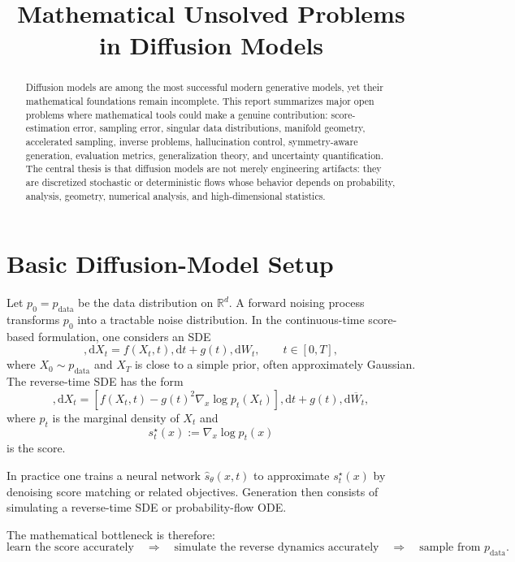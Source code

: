 \documentclass[11pt]{article}
\title{\textbf{Mathematical Unsolved Problems in Diffusion Models}}
\author{}
\date{}
\newcommand{\R}{\mathbb{R}}
\newcommand{\pdata}{p_{\mathrm{data}}}
\newcommand{\dd}{,\mathrm{d}}
\begin{document}
\maketitle

\begin{abstract}
Diffusion models are among the most successful modern generative models, yet their mathematical foundations remain incomplete. This report summarizes major open problems where mathematical tools could make a genuine contribution: score-estimation error, sampling error, singular data distributions, manifold geometry, accelerated sampling, inverse problems, hallucination control, symmetry-aware generation, evaluation metrics, generalization theory, and uncertainty quantification. The central thesis is that diffusion models are not merely engineering artifacts: they are discretized stochastic or deterministic flows whose behavior depends on probability, analysis, geometry, numerical analysis, and high-dimensional statistics.
\end{abstract}

\section{Basic Diffusion-Model Setup}

Let $p_0 = \pdata$ be the data distribution on $\R^d$. A forward noising process transforms $p_0$ into a tractable noise distribution. In the continuous-time score-based formulation, one considers an SDE
\begin{equation}
\dd X_t = f(X_t,t)\dd t + g(t)\dd W_t,
\qquad t \in [0,T],
\end{equation}
where $X_0 \sim \pdata$ and $X_T$ is close to a simple prior, often approximately Gaussian. The reverse-time SDE has the form
\begin{equation}
\dd X_t =
\left[
f(X_t,t) - g(t)^2 \nabla_x \log p_t(X_t)
\right]\dd t
+ g(t)\dd \overline{W}_t,
\end{equation}
where $p_t$ is the marginal density of $X_t$ and
\begin{equation}
s_t^\star(x) := \nabla_x \log p_t(x)
\end{equation}
is the score.

In practice one trains a neural network $\widehat{s}_\theta(x,t)$ to approximate $s_t^\star(x)$ by denoising score matching or related objectives. Generation then consists of simulating a reverse-time SDE or probability-flow ODE.

The mathematical bottleneck is therefore:
\begin{equation}
\text{learn the score accurately}
\quad \Longrightarrow \quad
\text{simulate the reverse dynamics accurately}
\quad \Longrightarrow \quad
\text{sample from } \pdata.
\end{equation}
\end{document}
